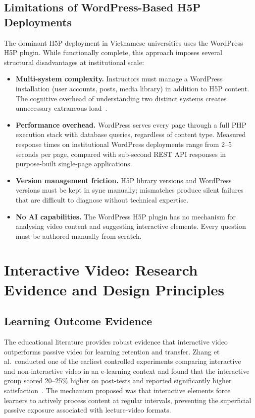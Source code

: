 \subsection{Limitations of WordPress-Based H5P Deployments}

The dominant H5P deployment in Vietnamese universities uses the WordPress
H5P plugin. While functionally complete, this approach imposes several
structural disadvantages at institutional scale:

\begin{itemize}
  \item \textbf{Multi-system complexity.} Instructors must manage a
  WordPress installation (user accounts, posts, media library) in addition
  to H5P content. The cognitive overhead of understanding two distinct
  systems creates unnecessary extraneous load~\cite{sweller1988}.

  \item \textbf{Performance overhead.} WordPress serves every page through a
  full PHP execution stack with database queries, regardless of content type.
  Measured response times on institutional WordPress deployments range from
  2--5 seconds per page, compared with sub-second REST API responses in
  purpose-built single-page applications.

  \item \textbf{Version management friction.} H5P library versions and
  WordPress versions must be kept in sync manually; mismatches produce
  silent failures that are difficult to diagnose without technical expertise.

  \item \textbf{No AI capabilities.} The WordPress H5P plugin has no
  mechanism for analysing video content and suggesting interactive elements.
  Every question must be authored manually from scratch.
\end{itemize}

\section{Interactive Video: Research Evidence and Design Principles}

\subsection{Learning Outcome Evidence}

The educational literature provides robust evidence that interactive video
outperforms passive video for learning retention and transfer. Zhang et al.\
conducted one of the earliest controlled experiments comparing interactive
and non-interactive video in an e-learning context and found that the
interactive group scored 20--25\% higher on post-tests and reported
significantly higher satisfaction~\cite{zhang2006}. The mechanism proposed
was that interactive elements force learners to actively process content at
regular intervals, preventing the superficial passive exposure associated
with lecture-video formats.

